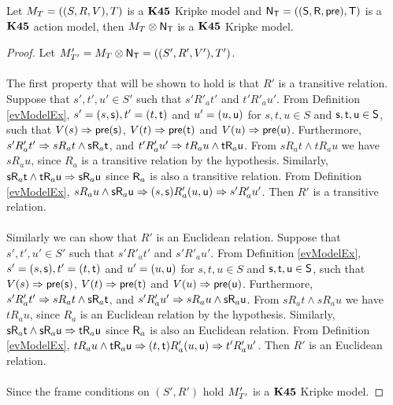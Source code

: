 \begin{lemma}
	Let $\krMo_T = ((S,R,V),T)$ is a $\AXKFF$ Kripke model and $\evM_\evT = ((\evS,\evR,\evpr),\evT)$ is a $\AXKFF$ action model, then
	$\krMo_T \otimes \evM_\evT$ is a $\AXKFF$ Kripke model.
\end{lemma}
\begin{proof} \label{proof:lemma:k45preserved}
	Let $\krMo'_{T'} = \krMo_T \otimes \evM_\evT = ((S',R',V'),T')$.\\
	\\
	The first property that will be shown to hold is that $R'$ is a transitive relation.
	Suppose that $s',t',u' \in S'$ such that $s' R'_a t'$ and $t' R'_a u'$.
	From Definition \ref{evModelEx}, $s' = (s,\evs), t' = (t,\evt)$ and $u' = (u,\evu)$ for $s,t,u \in
	S$ and $\evs,\evt,\evu \in \evS$, such that $V(s) \Rightarrow \evpr(\evs)$, $V(t) \Rightarrow
	\evpr(\evt)$ and $V(u) \Rightarrow \evpr(\evu)$.
	Furthermore, $s' R'_a t' \Rightarrow s R_a t \land \evs \evR_a \evt$, and $t' R'_a u' \Rightarrow
	t R_a u \land \evt \evR_a \evu$.
	From $s R_a t \land t R_a u$ we have $s R_a u$, since $R_a$ is a transitive relation by the
	hypothesis.
	Similarly, $\evs \evR_a \evt \land \evt \evR_a \evu \Rightarrow \evs \evR_a \evu$ since $\evR_a$
	is also a transitive relation.
	From Definition \ref{evModelEx}, $s R_a u \land \evs \evR_a \evu \Rightarrow (s,\evs) R'_a (u,\evu)
	\Rightarrow s' R'_a u'$.
	Then $R'$ is a transitive relation.\\
	\\
	Similarly we can show that $R'$ is an Euclidean relation.
	Suppose that $s',t',u' \in S'$ such that $s' R'_a t'$ and $s' R'_a u'$.
	From Definition \ref{evModelEx}, $s' = (s,\evs), t' = (t,\evt)$ and $u' = (u,\evu)$ for $s,t,u \in
	S$ and $\evs,\evt,\evu \in \evS$, such that $V(s) \Rightarrow \evpr(\evs)$, $V(t) \Rightarrow
	\evpr(\evt)$ and $V(u) \Rightarrow \evpr(\evu)$.
	Furthermore, $s' R'_a t' \Rightarrow s R_a t \land \evs \evR_a \evt$, and $s' R'_a u' \Rightarrow
	s R_a u \land \evs \evR_a \evu$.
	From $s R_a t \land s R_a u$ we have $t R_a u$, since $R_a$ is an Euclidean relation by the
	hypothesis.
	Similarly, $\evs \evR_a \evt \land \evs \evR_a \evu \Rightarrow \evt \evR_a \evu$ since $\evR_a$
	is also an Euclidean relation.
	From Definition \ref{evModelEx}, $t R_a u \land \evt \evR_a \evu \Rightarrow (t,\evt) R'_a (u,\evu)
	\Rightarrow t' R'_a u'$.
	Then $R'$ is an Euclidean relation.\\
	\\
	Since the frame conditions on $(S',R')$ hold $\krMo'_{T'}$ is a $\AXKFF$ Kripke model.
\end{proof}
